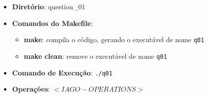 \begin{itemize}
	\item{\textbf{Diretório}: question\_01}
	\item{\textbf{Comandos do Makefile}:
	\begin{itemize}
		\item{\textbf{make}: compila o código, gerando o executável de nome \texttt{q01}}
		\item{\textbf{make clean}: remove o executável de nome \texttt{q01}}
	\end{itemize}}
	\item{\textbf{Comando de Execução}: \texttt{./q01}}
	\item{\textbf{Operações}: $<IAGO-OPERATIONS>$}
\end{itemize}

